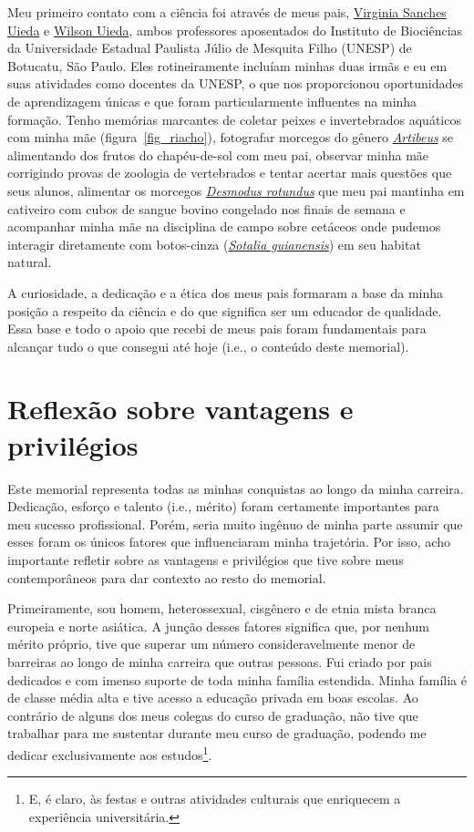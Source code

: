\documentclass[12pt,a4paper,oneside]{book}
\begin{document}
Meu primeiro contato com a ciência foi através de meus pais,
\href{https://orcid.org/0000-0002-6078-1342}{Virginia Sanches Uieda} e
\href{https://orcid.org/0000-0002-4177-3339}{Wilson Uieda},
ambos professores aposentados do Instituto de Biociências da Universidade
Estadual Paulista Júlio de Mesquita Filho (UNESP) de Botucatu, São Paulo.
Eles rotineiramente incluíam minhas duas irmãs e eu em suas atividades como
docentes da UNESP, o que nos proporcionou oportunidades de aprendizagem únicas
e que foram particularmente influentes na minha formação.
Tenho memórias marcantes de coletar peixes e invertebrados aquáticos com minha
mãe (figura~\ref{fig_riacho}), fotografar morcegos do gênero
\href{https://pt.wikipedia.org/wiki/Artibeus}{\textit{Artibeus}} se alimentando
dos frutos do chapéu-de-sol com meu pai, observar minha mãe corrigindo provas
de zoologia de vertebrados e tentar acertar mais questões que seus alunos,
alimentar os morcegos
\href{https://pt.wikipedia.org/wiki/Desmodus_rotundus}{\textit{Desmodus rotundus}}
que meu pai mantinha em cativeiro com cubos de sangue bovino congelado nos
finais de semana e acompanhar minha mãe na disciplina de campo sobre cetáceos
onde pudemos interagir diretamente com botos-cinza
(\href{https://pt.wikipedia.org/wiki/Sotalia_guianensis}{\textit{Sotalia guianensis}})
em seu habitat natural.

A curiosidade, a dedicação e a ética dos meus pais formaram a base da minha
posição a respeito da ciência e do que significa ser um educador de qualidade.
Essa base e todo o apoio que recebi de meus pais foram fundamentais para
alcançar tudo o que consegui até hoje (i.e., o conteúdo deste memorial).

\section{Reflexão sobre vantagens e privilégios}

Este memorial representa todas as minhas conquistas ao longo da minha carreira.
Dedicação, esforço e talento (i.e., mérito) foram certamente importantes para
meu sucesso profissional.
Porém, seria muito ingênuo de minha parte assumir que esses foram os únicos
fatores que influenciaram minha trajetória.
Por isso, acho importante refletir sobre as vantagens e privilégios que tive
sobre meus contemporâneos para dar contexto ao resto do memorial.

Primeiramente, sou homem, heterossexual, cisgênero e de etnia mista branca
europeia e norte asiática.
A junção desses fatores significa que, por nenhum mérito próprio, tive que
superar um número consideravelmente menor de barreiras ao longo de minha
carreira que outras pessoas.
Fui criado por pais dedicados e com imenso suporte de toda minha família
estendida.
Minha família é de classe média alta e tive acesso a educação privada em boas
escolas.
Ao contrário de alguns dos meus colegas do curso de graduação, não tive que
trabalhar para me sustentar durante meu curso de graduação, podendo me dedicar
exclusivamente aos estudos\footnote{E, é claro, às festas e outras atividades
culturais que enriquecem a experiência universitária.}.
\end{document}
